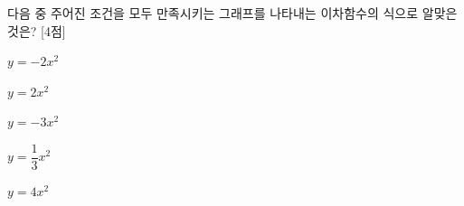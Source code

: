 다음 중 주어진 조건을 모두 만족시키는 그래프를 나타내는 이차함수의 식으로 알맞은 것은? \mbox{[4점]}
\begin{choices32}{\rule[-3ex]{0pt}{8ex}$y=-2x^2$}{\rule[-3ex]{0pt}{8ex}$y=2x^2$}{\rule[-3ex]{0pt}{8ex}$y=-3x^2$}{\rule[-3ex]{0pt}{8ex}$y=\dfrac{1}{3}x^2$}{\rule[-3ex]{0pt}{8ex}$y=4x^2$}\end{choices32}
